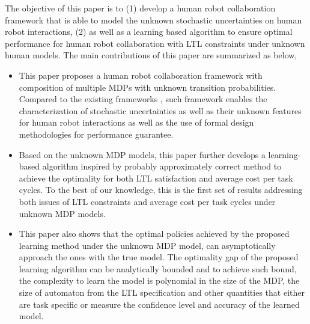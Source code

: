 \documentclass[journal]{IEEEtran}
\begin{document}


The objective of this paper is to (1) develop a human robot collaboration framework that is able to model the unknown stochastic uncertainties on human robot interactions, (2) as well as a learning based algorithm to ensure optimal performance for human robot collaboration with LTL constraints under unknown human models. The main contributions of this paper are summarized as below,
\begin{itemize}
	\item This paper proposes a human robot collaboration framework with composition of multiple MDPs with unknown transition probabilities. Compared to the existing frameworks \cite{lee1992trust,desai2013impact,ji2006probabilistic,fujieSharedAutonomy}, such framework enables the characterization of stochastic uncertainties as well as their unknown features for human robot interactions as well as the use of formal design methodologies for performance guarantee.  
	\item Based on the unknown MDP models, this paper further develops a learning-based algorithm inspired by probably approximately correct method to achieve the optimality for both LTL satisfaction and average cost per task cycles. To the best of our knowledge, this is the first set of results addressing both issues of LTL constraints and average cost per task cycles under unknown MDP models. 
	\item This paper also shows that the optimal policies achieved by the proposed learning method under the unknown MDP model, can asymptotically approach the ones with the true model. The optimality gap of the proposed learning algorithm can be analytically bounded and to achieve such bound, the complexity to learn the model is polynomial in the size of the MDP, the size of automaton from the LTL specification and other quantities that either are task specific or measure the confidence level and accuracy of the learned model.
\end{itemize}
\end{document}
